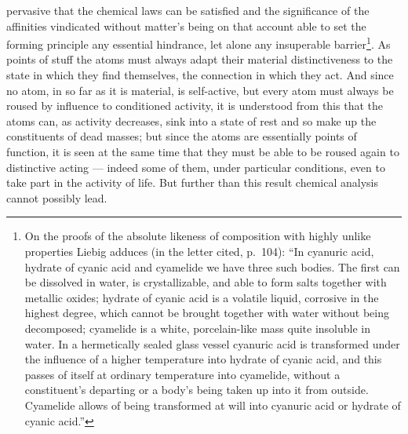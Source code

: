 \documentclass[12pt,a4paper]{book}
\begin{document}
pervasive that the chemical laws can be satisfied and the significance of the
affinities vindicated without matter's being on that account able to set the
forming principle any essential hindrance, let alone any insuperable
barrier\footnote{On the proofs of the absolute likeness of composition with
highly unlike properties Liebig adduces (in the letter cited, p.~104): ``In
cyanuric acid, hydrate of cyanic acid and cyamelide we have three such bodies.
The first can be dissolved in water, is crystallizable, and able to form salts
together with metallic oxides; hydrate of cyanic acid is a volatile liquid,
corrosive in the highest degree, which cannot be brought together with water
without being decomposed; cyamelide is a white, porcelain-like mass quite
insoluble in water. In a hermetically sealed glass vessel cyanuric acid is
transformed under the influence of a higher temperature into hydrate of cyanic
acid, and this passes of itself at ordinary temperature into cyamelide, without
a constituent's departing or a body's being taken up into it from outside.
Cyamelide allows of being transformed at will into cyanuric acid or hydrate of
cyanic acid.''
}. As points of stuff the atoms must
always adapt their material distinctiveness to the state in which they find
themselves, the connection in which they act. And since no atom, in so far as
it is material, is self-active, but every atom must always be roused by
influence to conditioned activity, it is understood from this that the atoms
can, as activity decreases, sink into a state of rest and so make up the
constituents of dead masses; but since the atoms are essentially points of
function, it is seen at the same time that they must be able to be roused again
to distinctive acting --- indeed some of them, under particular conditions,
even to take part in the activity of life. But further than this result
chemical analysis cannot possibly lead.
\end{document}
